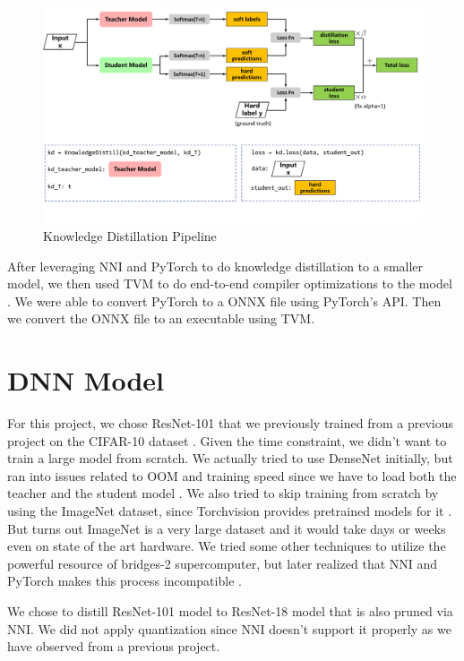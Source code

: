 \documentclass{article}
\begin{document}
\begin{figure}
	\centerline{\includegraphics[width=7in]{../proj4/figures/distill.png}}
	\caption{Knowledge Distillation Pipeline \cite{nni}}
	\label{fig:kd-pipe}
\end{figure}

After leveraging NNI and PyTorch to do knowledge distillation to a smaller model, we then used TVM to do end-to-end compiler optimizations to the model \cite{tvm}.
We were able to convert PyTorch to a ONNX file using PyTorch's API. Then we convert the ONNX file to an executable using TVM.

\section{DNN Model}
For this project, we chose ResNet-101 that we previously trained from a previous project on the CIFAR-10 dataset \cite{resnet, cifar10}. Given the time constraint, we didn't want to train a large model from scratch. We actually tried to use DenseNet initially, but ran into issues related to OOM and training speed since we have to load both the teacher and the student model \cite{densenet}. We also tried to skip training from scratch by using the ImageNet dataset, since Torchvision provides pretrained models for it \cite{imagenet, torchvision}. But turns out ImageNet is a very large dataset and it would take days or weeks even on state of the art hardware. We tried some other techniques to utilize the powerful resource of bridges-2 supercomputer, but later realized that NNI and PyTorch makes this process incompatible \cite{bridges-2}.

We chose to distill ResNet-101 model to ResNet-18 model that is also pruned via NNI. We did not apply quantization since NNI doesn't support it properly as we have observed from a previous project.
\end{document}
